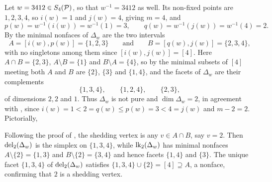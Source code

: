\begin{example}
\label{ex: 3412}
    Let $w = 3412 \in S_4(\mathcal{P})$, so that $w^{-1} = 3412$ as well. Its non-fixed
    points are $1,2,3,4$, so $i(w) = 1$ and $j(w) = 4$, giving $m = 4$, and
    \[
    p(w) = w^{-1}(i(w)) = w^{-1}(1) = 3,
    \qquad
    q(w) = w^{-1}(j(w)) = w^{-1}(4) = 2.
    \]
    By  the minimal nonfaces of $\Delta_w$ are the two intervals
    \[
    A = [i(w),p(w)] = \{1,2,3\}
    \qquad\text{and}\qquad
    B = [q(w),j(w)] = \{2,3,4\},
    \]
    with no singletons among them since $[i(w),j(w)] = [4]$. Here
    $A\cap B = \{2,3\}$, $A\setminus B = \{1\}$ and $B\setminus A = \{4\}$, so by
     the minimal subsets of
    $[4]$ meeting both $A$ and $B$ are $\{2\}$, $\{3\}$ and $\{1,4\}$, and the facets
    of $\Delta_w$ are their complements
    \[
    \{1,3,4\},\qquad \{1,2,4\},\qquad \{2,3\},
    \]
    of dimensions $2,2$ and $1$. Thus $\Delta_w$ is not pure and
    $\dim\Delta_w = 2$, in agreement with
    , since
    $i(w) = 1 < 2 = q(w) \leq p(w) = 3 < 4 = j(w)$ and $m-2 = 2$. Pictorially,
     \begin{center}
    \end{center}
    Following the proof of
    , the shedding vertex is any $v \in A\cap B$, say $v = 2$. Then $\mathrm{del}_2(\Delta_w)$ is the simplex on $\{1,3,4\}$, while $\mathrm{lk}_2(\Delta_w)$ has minimal nonfaces $A\setminus\{2\} = \{1,3\}$ and $B\setminus\{2\} = \{3,4\}$ and hence facets $\{1,4\}$ and $\{3\}$. The unique facet $\{1,3,4\}$ of $\mathrm{del}_2(\Delta_w)$ satisfies $\{1,3,4\}\cup\{2\} = [4]\supseteq A$, a nonface, confirming that $2$ is a shedding vertex.
\end{example}
